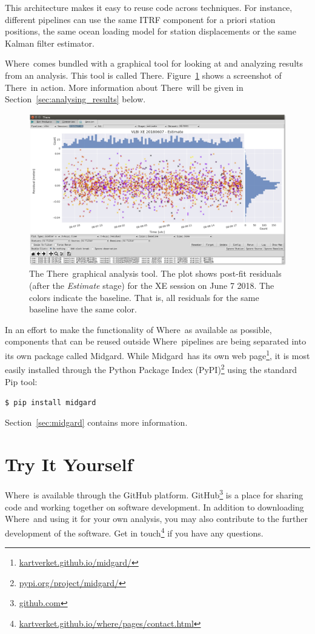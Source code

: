 \documentclass[twocolumn,twoside]{svmultivs_gm} %
\newcommand{\code}[1]{{\footnotesize\texttt{#1}}}
\newcommand{\where}{\textsf{Where}}
\newcommand{\there}{\textsf{There}}
\newcommand{\midgard}{\textsf{Midgard}}
\begin{document}
This architecture makes it easy to reuse code across techniques. For instance, different pipelines can use the same ITRF component for a priori station positions, the same ocean loading model for station displacements or the same Kalman filter estimator.

\where\ comes bundled with a graphical tool for looking at and analyzing results from an analysis. This tool is called \there. Figure~\ref{fig:there} shows a screenshot of \there\ in action. More information about \there\ will be given in Section~\ref{sec:analysing_results} below.

\begin{figure}[htb!]
  \includegraphics[width=.5\textwidth]{hjelle02.png}
  \caption{The \there\ graphical analysis tool. The plot shows post-fit residuals (after the \emph{Estimate} stage) for the XE session on June 7 2018. The colors indicate the baseline. That is, all residuals for the same baseline have the same color.}
  \label{fig:there}
\end{figure}

In an effort to make the functionality of \where\ as available as possible, components that can be reused outside \where\ pipelines are being separated into its own package called \midgard. While \midgard\ has its own web page\footnote{\url{kartverket.github.io/midgard/}}, it is most easily installed through the Python Package Index (PyPI)\footnote{\url{pypi.org/project/midgard/}} using the standard \textsf{Pip} tool:

\code{\$ pip install midgard}

Section~\ref{sec:midgard} contains more information.
%
\section{Try It Yourself}
%
\where\ is available through the GitHub platform. GitHub\footnote{\url{github.com}} is a place for sharing code and working together on software development. In addition to downloading \where\ and using it for your own analysis, you may also contribute to the further development of the software. Get in touch\footnote{\url{kartverket.github.io/where/pages/contact.html}} if you have any questions.
\end{document}
